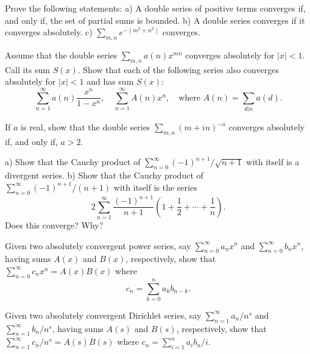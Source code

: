 \begin{problembox}
Prove the following statements:
a) A double series of positive terms converges if, and only if, the set of partial sums is bounded.
b) A double series converges if it converges absolutely.
c) \(\sum_{m,n} e^{-(m^2+n^2)}\) converges.
\end{problembox}

\begin{problembox}
Assume that the double series \(\sum_{m,n} a(n)x^{mn}\) converges absolutely for \(|x| < 1\). Call its sum \(S(x)\). Show that each of the following series also converges absolutely for \(|x| < 1\) and has sum \(S(x)\):
\[\sum_{n=1}^{\infty} a(n) \frac{x^n}{1 - x^n}, \quad \sum_{n=1}^{\infty} A(n)x^n, \quad \text{where } A(n) = \sum_{d|n} a(d).\]
\end{problembox}

\begin{problembox}
If \(a\) is real, show that the double series \(\sum_{m,n} (m + i n)^{-a}\) converges absolutely if, and only if, \(a > 2\).
\end{problembox}

\begin{problembox}
a) Show that the Cauchy product of \(\sum_{n=0}^{\infty} (-1)^{n+1}/\sqrt{n + 1}\) with itself is a divergent series.
b) Show that the Cauchy product of \(\sum_{n=0}^{\infty} (-1)^{n+1}/(n + 1)\) with itself is the series
\[2 \sum_{n=1}^{\infty} \frac{(-1)^{n+1}}{n + 1} \left( 1 + \frac{1}{2} + \cdots + \frac{1}{n} \right).\]
Does this converge? Why?
\end{problembox}

\begin{problembox}
Given two absolutely convergent power series, say \(\sum_{n=0}^{\infty} a_n x^n\) and \(\sum_{n=0}^{\infty} b_n x^n\), having sums \(A(x)\) and \(B(x)\), respectively, show that \(\sum_{n=0}^{\infty} c_n x^n = A(x) B(x)\) where
\[c_n = \sum_{k=0}^{n} a_k b_{n-k}.\]
\end{problembox}

\begin{problembox}
Given two absolutely convergent Dirichlet series, say \(\sum_{n=1}^{\infty} a_n / n^s\) and \(\sum_{n=1}^{\infty} b_n / n^s\), having sums \(A(s)\) and \(B(s)\), respectively, show that \(\sum_{n=1}^{\infty} c_n / n^s = A(s) B(s)\) where \(c_n = \sum_{i=1}^{n} a_i b_n / i\).
\end{problembox}

